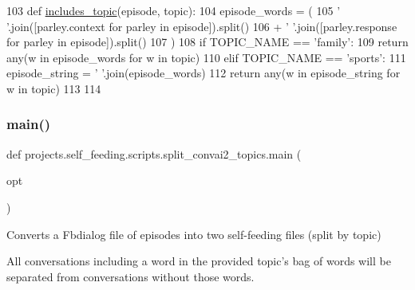 \begin{DoxyCode}
103 \textcolor{keyword}{def }\hyperlink{namespaceprojects_1_1self__feeding_1_1scripts_1_1split__convai2__topics_a273e2c722d60a60b074557be2a4a0714}{includes\_topic}(episode, topic):
104     episode\_words = (
105         \textcolor{stringliteral}{' '}.join([parley.context \textcolor{keywordflow}{for} parley \textcolor{keywordflow}{in} episode]).split()
106         + \textcolor{stringliteral}{' '}.join([parley.response \textcolor{keywordflow}{for} parley \textcolor{keywordflow}{in} episode]).split()
107     )
108     \textcolor{keywordflow}{if} TOPIC\_NAME == \textcolor{stringliteral}{'family'}:
109         \textcolor{keywordflow}{return} any(w \textcolor{keywordflow}{in} episode\_words \textcolor{keywordflow}{for} w \textcolor{keywordflow}{in} topic)
110     \textcolor{keywordflow}{elif} TOPIC\_NAME == \textcolor{stringliteral}{'sports'}:
111         episode\_string = \textcolor{stringliteral}{' '}.join(episode\_words)
112         \textcolor{keywordflow}{return} any(w \textcolor{keywordflow}{in} episode\_string \textcolor{keywordflow}{for} w \textcolor{keywordflow}{in} topic)
113 
114 
\end{DoxyCode}
\mbox{\label{namespaceprojects_1_1self__feeding_1_1scripts_1_1split__convai2__topics_ab05b7abb9e9f7c1778462fc1ac5345f1}} 
\subsubsection{\texorpdfstring{main()}{main()}}
{\footnotesize\ttfamily def projects.\+self\+\_\+feeding.\+scripts.\+split\+\_\+convai2\+\_\+topics.\+main (\begin{DoxyParamCaption}\item[{}]{opt }\end{DoxyParamCaption})}

\begin{DoxyVerb}Converts a Fbdialog file of episodes into two self-feeding files (split by topic)

All conversations including a word in the provided topic's bag of words will be
separated from conversations without those words.
\end{DoxyVerb}
 

